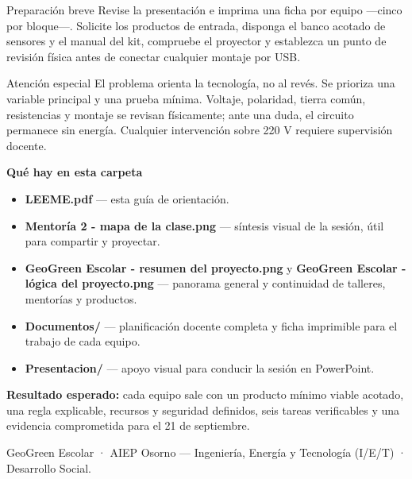 \documentclass[9pt,a4paper]{article}
\begin{document}
\begin{softbox}{Preparación breve}
Revise la presentación e imprima una ficha por equipo —cinco por bloque—. Solicite los productos de entrada, disponga el banco acotado de sensores y el manual del kit, compruebe el proyector y establezca un punto de revisión física antes de conectar cualquier montaje por USB.
\end{softbox}

\begin{accentbox}{Atención especial}
El problema orienta la tecnología, no al revés. Se prioriza una variable principal y una prueba mínima. Voltaje, polaridad, tierra común, resistencias y montaje se revisan físicamente; ante una duda, el circuito permanece sin energía. Cualquier intervención sobre 220 V requiere supervisión docente.
\end{accentbox}

{\bfseries\color{AIEPNavy}Qué hay en esta carpeta}\par
\begin{itemize}
  \item \textbf{LEEME.pdf} — esta guía de orientación.
  \item \textbf{Mentoría 2 - mapa de la clase.png} — síntesis visual de la sesión, útil para compartir y proyectar.
  \item \textbf{GeoGreen Escolar - resumen del proyecto.png} y \textbf{GeoGreen Escolar - lógica del proyecto.png} — panorama general y continuidad de talleres, mentorías y productos.
  \item \textbf{Documentos/} — planificación docente completa y ficha imprimible para el trabajo de cada equipo.
  \item \textbf{Presentacion/} — apoyo visual para conducir la sesión en PowerPoint.
\end{itemize}

\begin{tcolorbox}[colback=AIEPNavy,colframe=AIEPNavy,coltext=white,boxrule=0pt,arc=1mm,left=3mm,right=3mm,top=1.8mm,bottom=1.8mm,before skip=3pt]
\textbf{Resultado esperado:} cada equipo sale con un producto mínimo viable acotado, una regla explicable, recursos y seguridad definidos, seis tareas verificables y una evidencia comprometida para el 21 de septiembre.
\end{tcolorbox}

\vfill
{\footnotesize\color{AIEPMuted}GeoGreen Escolar · AIEP Osorno — Ingeniería, Energía y Tecnología (I/E/T) · Desarrollo Social.}
\end{document}
